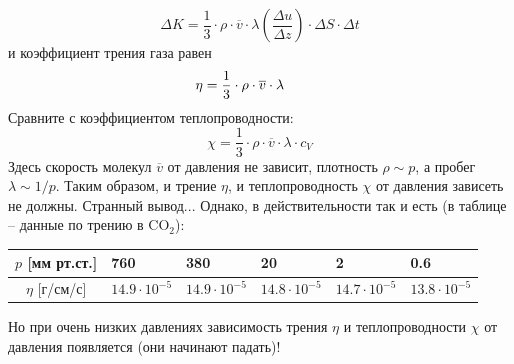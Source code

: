 \documentclass[12pt,epsfig,color,russian]{article}
\begin{document}
\begin{displaymath}
\Delta K =
\frac13\cdot\rho\cdot\overline{v}\cdot\lambda\left(\frac{\Delta u}{\Delta z}\right)\cdot\Delta S\cdot\Delta t
\end{displaymath}
и коэффициент трения газа равен
\begin{equation}\label{Eq.eta}
\eta=\frac13\cdot\rho\cdot\overline{v}\cdot\lambda\hspace{10mm}
\end{equation}
Сравните с коэффициентом теплопроводности:
\begin{equation}\label{Eq.chi}
\chi=\frac13\cdot\rho\cdot\overline{v}\cdot\lambda\cdot c_V
\end{equation}
Здесь скорость молекул $\overline{v}$ от давления не зависит, плотность $\rho\sim p$, а пробег $\lambda\sim1/p$. Таким образом, и трение $\eta$, и теплопроводность $\chi$ от давления зависеть не должны. Странный вывод... Однако, в действитель\-но\-с\-ти так и есть (в таблице -- данные по трению в CO$_2$):
\begin{center}
\begin{tabular}{|c||p{25mm}|p{25mm}|p{25mm}|p{25mm}|p{25mm}|}\hline
$p$ [мм рт.ст.] & 760  & 380  & 20 & 2 & 0.6 \\ \hline \hline
$\eta$ [г/см/с] &
$14.9\cdot10^{-5}$&
$14.9\cdot10^{-5}$&
$14.8\cdot10^{-5}$&
$14.7\cdot10^{-5}$&
$13.8\cdot10^{-5}$ \\ \hline
\end{tabular}
\end{center}
Но при очень низких давлениях зависимость трения $\eta$ и теплопроводности $\chi$ от давления появляется (они начинают падать)! \\
\end{document}
